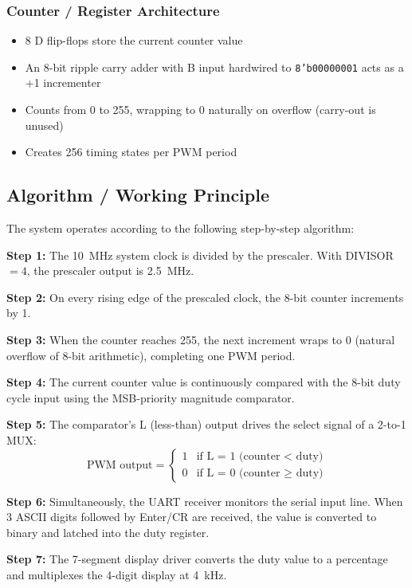 \documentclass[12pt,a4paper]{article}
\begin{document}
\subsubsection*{Counter / Register Architecture}
\begin{itemize}
\item 8 D flip-flops store the current counter value
\item An 8-bit ripple carry adder with B input hardwired to \texttt{8'b00000001} acts as a +1 incrementer
\item Counts from 0 to 255, wrapping to 0 naturally on overflow (carry-out is unused)
\item Creates 256 timing states per PWM period
\end{itemize}

\subsection{Algorithm / Working Principle}
The system operates according to the following step-by-step algorithm:

\textbf{Step 1:} The 10~MHz system clock is divided by the prescaler. With DIVISOR${}=4$, the prescaler output is 2.5~MHz.

\textbf{Step 2:} On every rising edge of the prescaled clock, the 8-bit counter increments by 1.

\textbf{Step 3:} When the counter reaches 255, the next increment wraps to 0 (natural overflow of 8-bit arithmetic), completing one PWM period.

\textbf{Step 4:} The current counter value is continuously compared with the 8-bit duty cycle input using the MSB-priority magnitude comparator.

\textbf{Step 5:} The comparator's L (less-than) output drives the select signal of a 2-to-1 MUX:
\[
\text{PWM output} = \begin{cases}
1 & \text{if L = 1 (counter < duty)} \\
0 & \text{if L = 0 (counter $\geq$ duty)}
\end{cases}
\]

\textbf{Step 6:} Simultaneously, the UART receiver monitors the serial input line. When 3 ASCII digits followed by Enter/CR are received, the value is converted to binary and latched into the duty register.

\textbf{Step 7:} The 7-segment display driver converts the duty value to a percentage and multiplexes the 4-digit display at 4~kHz.
\end{document}
